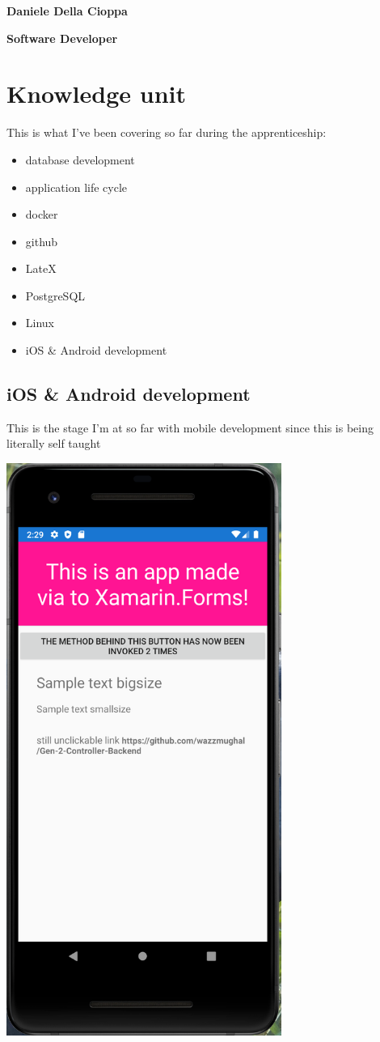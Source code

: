 \documentclass[a4paper,12pt]{article}
\begin{document}
\textbf{Daniele Della Cioppa}

\textbf{Software Developer}

\tableofcontents
\clearpage

\section{Knowledge unit}

This is what I've been covering so far during the apprenticeship:

\begin{itemize}
\item {database development}
\item {application life cycle}
\item docker
\item github 
\item LateX
\item PostgreSQL
\item Linux
\item {iOS & Android development}
\end{itemize}
\clearpage

\subsection{iOS & Android development}
This is the stage I'm at so far with mobile development since this is being literally self taught

\includegraphics[width=9cm]{./capture-app.PNG}
\end{document}
